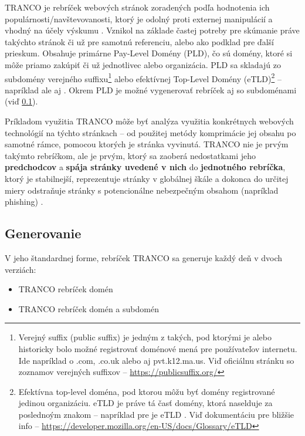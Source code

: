 TRANCO je rebríček webových stránok zoradených podľa hodnotenia ich populárnosti/navštevovanosti, ktorý je odolný proti externej manipulácií a vhodný na účely výskumu \cite{tranco-homepage}. 
Vznikol na základe častej potreby pre skúmanie práve takýchto stránok či už pre samotnú referenciu, alebo ako podklad pre ďalší prieskum.
Obsahuje primárne Pay-Level Domény (PLD), čo sú domény, ktoré si môže priamo zakúpiť či už jednotlivec alebo organizácia. PLD sa skladajú zo subdomény verejného 
suffixu\footnote{Verejný suffix (public suffix) je jedným z takých, pod ktorými je alebo historicky bolo možné registrovať doménové mená pre používateľov internetu. Ide napríklad o .com, .co.uk 
alebo aj pvt.k12.ma.us. Viď oficiálnu stránku so zoznamov verejných suffixov -- \href{https://publicsuffix.org/}{https://publicsuffix.org/}} 
alebo efektívnej Top-Level Domény (eTLD)\footnote{Efektívna top-level doména, pod ktorou môžu byť domény registrované jedinou organizáciu. eTLD je práve tá časť domény, ktorá naselduje za poslednoým 
znakom  -- napríklad pre  je eTLD . Viď dokumentáciu pre bližšie info -- \href{https://developer.mozilla.org/en-US/docs/Glossary/eTLD}
{https://developer.mozilla.org/en-US/docs/Glossary/eTLD}} -- napríklad  ale aj  \cite{tranco}. Okrem PLD je možné vygenerovať rebríček aj so subdoménami (viď 
\ref{tranco-generation}).

Príkladom využitia TRANCO môže byť analýza využitia konkrétnych webových technológií na týchto stránkach -- od použitej metódy komprimácie jej obsahu po samotné rámce, pomocou ktorých je 
stránka vyvinutá. 
TRANCO nie je prvým takýmto rebríčkom, ale je prvým, ktorý sa zaoberá nedostatkami jeho \textbf{predchodcov} a \textbf{spája stránky uvedené v nich} do \textbf{jednotného rebríčka}, 
ktorý je stabilnejší, reprezentuje stránky v globálnej škále a dokonca do určitej miery odstraňuje stránky s potencionálne nebezpečným obsahom (napríklad phishing) \cite{tranco}. 

\subsection{Generovanie}
\label{tranco-generation}

V jeho štandardnej forme, rebríček TRANCO sa generuje každý deň v dvoch verziách:
\begin{itemize}
    \item TRANCO rebríček domén
    \item TRANCO rebríček domén a subdomén
\end{itemize}

